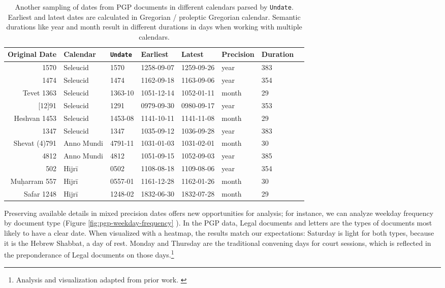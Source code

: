 \documentclass{anthology-ch}         %
\begin{document}
\begin{table}[h]
  \centering 
  \begin{tabular}{rlllllll}
    \toprule
Original Date & Calendar & \texttt{Undate} & Earliest & Latest & Precision & Duration \\ 
\midrule
1570 & Seleucid & 1570 & 1258-09-07 & 1259-09-26 & year & 383 \\
1474 & Seleucid & 1474 & 1162-09-18 & 1163-09-06 & year & 354 \\
Tevet 1363 & Seleucid & 1363-10 & 1051-12-14 & 1052-01-11 & month & 29 \\
{[12]91} & Seleucid & 1291 & 0979-09-30 & 0980-09-17 & year & 353 \\
Heshvan 1453 & Seleucid & 1453-08 & 1141-10-11 & 1141-11-08 & month & 29 \\
1347 & Seleucid & 1347 & 1035-09-12 & 1036-09-28 & year &  383 \\
\midrule
Shevat (4)791 & Anno Mundi & 4791-11 & 1031-01-03 & 1031-02-01 & month & 30 \\
4812 & Anno Mundi & 4812 & 1051-09-15 & 1052-09-03 & year & 385 \\
\midrule
502 & Hijrī & 0502 & 1108-08-18 & 1109-08-06 & year & 354 \\
Muḥarram 557 & Hijrī & 0557-01 & 1161-12-28 & 1162-01-26 & month & 30 \\
Safar 1248 & Hijrī & 1248-02 & 1832-06-30 & 1832-07-28 & month & 29 \\
\bottomrule
    \bottomrule
  \end{tabular}
  \caption{Another sampling of dates from PGP documents in different calendars parsed by \texttt{Undate}. Earliest and latest dates are calculated in Gregorian / proleptic Gregorian calendar. Semantic durations like year and month result in different durations in days when working with multiple calendars.}
  \label{tab:pgp-date-durations}
\end{table}



Preserving available details in mixed precision dates offers new opportunities for analysis; for instance, we can analyze weekday frequency by document type (Figure \ref{fig:pgp-weekday-frequency} ). In the PGP data, Legal documents and letters are the types of documents most likely to have a clear date. When visualized with a heatmap, the results match our expectations: Saturday is light for both types, because it is the Hebrew Shabbat, a day of rest. Monday and Thursday are the traditional convening days for court sessions, which is reflected in the preponderance of Legal documents on those days.\footnote{Analysis and visualization adapted from prior work. \cite{koeser_princeton_2025}}
\end{document}
